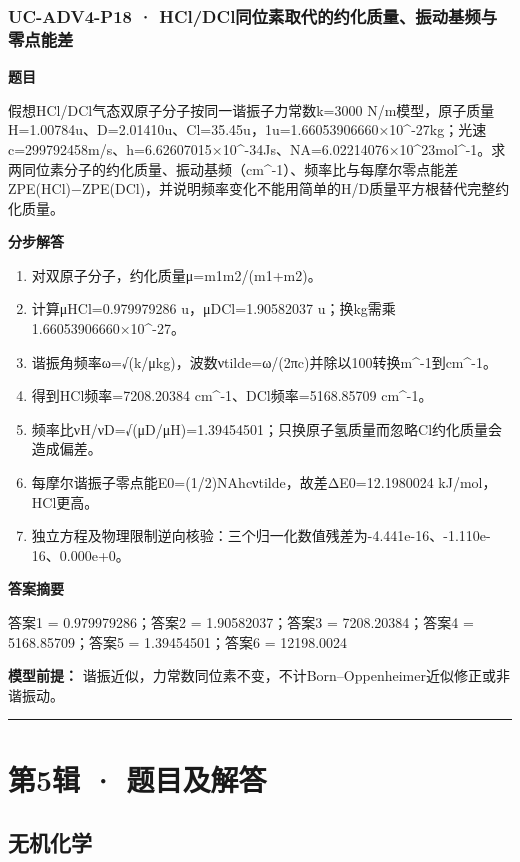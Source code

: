 \documentclass[UTF8,11pt,a4paper]{ctexart}
\begin{document}
\subsubsection*{UC-ADV4-P18 · HCl/DCl同位素取代的约化质量、振动基频与零点能差}
\noindent\textbf{题目}\par
假想HCl/DCl气态双原子分子按同一谐振子力常数k=3000 N/m模型，原子质量H=1.00784u、D=2.01410u、Cl=35.45u，1u=1.66053906660×10\textasciicircum{}-27kg；光速c=299792458m/s、h=6.62607015×10\textasciicircum{}-34Js、NA=6.02214076×10\textasciicircum{}23mol\textasciicircum{}-1。求两同位素分子的约化质量、振动基频（cm\textasciicircum{}-1）、频率比与每摩尔零点能差ZPE(HCl)−ZPE(DCl)，并说明频率变化不能用简单的H/D质量平方根替代完整约化质量。\par
\medskip\noindent\textbf{分步解答}
\begin{enumerate}
\item 对双原子分子，约化质量μ=m1m2/(m1+m2)。
\item 计算μHCl=0.979979286 u，μDCl=1.90582037 u；换kg需乘1.66053906660×10\textasciicircum{}-27。
\item 谐振角频率ω=√(k/μkg)，波数νtilde=ω/(2πc)并除以100转换m\textasciicircum{}-1到cm\textasciicircum{}-1。
\item 得到HCl频率=7208.20384 cm\textasciicircum{}-1、DCl频率=5168.85709 cm\textasciicircum{}-1。
\item 频率比νH/νD=√(μD/μH)=1.39454501；只换原子氢质量而忽略Cl约化质量会造成偏差。
\item 每摩尔谐振子零点能E0=(1/2)NAhcνtilde，故差ΔE0=12.1980024 kJ/mol，HCl更高。
\item 独立方程及物理限制逆向核验：三个归一化数值残差为-4.441e-16、-1.110e-16、0.000e+0。
\end{enumerate}
\noindent\textbf{答案摘要}\par
答案1 = 0.979979286；答案2 = 1.90582037；答案3 = 7208.20384；答案4 = 5168.85709；答案5 = 1.39454501；答案6 = 12198.0024\par
\noindent\textbf{模型前提：}
谐振近似，力常数同位素不变，不计Born–Oppenheimer近似修正或非谐振动。\par
\medskip\hrule\medskip
\clearpage
\section*{第5辑 · 题目及解答}
\subsection*{无机化学}
\end{document}
